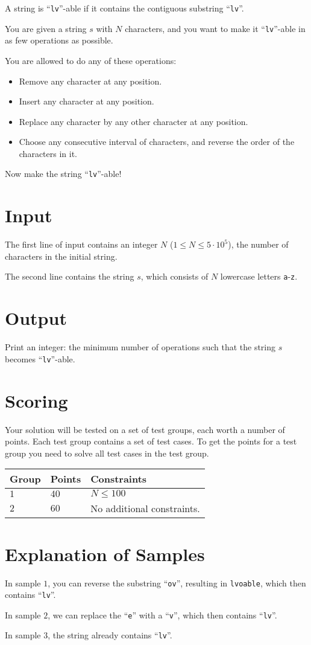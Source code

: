 \noindent
A string is ``\texttt{lv}''-able if it contains the contiguous substring ``\texttt{lv}''.

You are given a string $s$ with $N$ characters, and you want to make it ``\texttt{lv}''-able in as few operations as possible.

You are allowed to do any of these operations:
\begin{itemize}
  \item Remove any character at any position.
  \item Insert any character at any position.
  \item Replace any character by any other character at any position.
  \item Choose any consecutive interval of characters, and reverse the order of the characters in it.
\end{itemize}

Now make the string ``\texttt{lv}''-able!

\section*{Input}
The first line of input contains an integer $N$ ($1 \leq N \leq 5 \cdot 10^5$), the number of characters in the initial string.

The second line contains the string $s$, which consists of $N$ lowercase letters \texttt{a}-\texttt{z}.

\section*{Output}
Print an integer: the minimum number of operations such that the string $s$ becomes ``\texttt{lv}''-able.

\section*{Scoring}
Your solution will be tested on a set of test groups, each worth a number of points. Each test group contains
a set of test cases. To get the points for a test group you need to solve all test cases in the test group.

\noindent
\begin{tabular}{| l | l | p{12cm} |}
  \hline
  \textbf{Group} & \textbf{Points} & \textbf{Constraints} \\ \hline
  $1$    & $40$       & $N \leq 100$ \\ \hline
  $2$    & $60$       & No additional constraints. \\ \hline
\end{tabular}

\section*{Explanation of Samples}
In sample $1$, you can reverse the substring ``\texttt{ov}'', resulting in \texttt{lvoable}, which then contains
``\texttt{lv}''.

In sample $2$, we can replace the ``\texttt{e}'' with a ``\texttt{v}'', which then contains ``\texttt{lv}''.

In sample $3$, the string already contains ``\texttt{lv}''.
